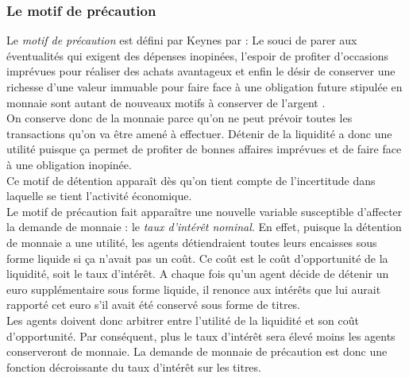 \documentclass[10pt]{book}
\begin{document}
\subsubsection{Le motif de précaution}
Le \textit{motif de précaution} est défini par Keynes par : \og Le souci de parer aux éventualités qui exigent des dépenses inopinées, l'espoir de profiter d'occasions imprévues pour réaliser des achats avantageux et enfin le désir de conserver une richesse d'une valeur immuable pour faire face à une obligation future stipulée en monnaie sont autant de nouveaux motifs à conserver de l'argent \fg .\\
On conserve donc de la monnaie parce qu'on ne peut prévoir toutes les transactions qu'on va être amené à effectuer. Détenir de la liquidité a donc une utilité puisque ça permet de profiter de bonnes affaires imprévues et de faire face à une obligation inopinée. \\
Ce motif de détention apparaît dès qu'on tient compte de l'incertitude dans laquelle se tient l'activité économique. \\
Le motif de précaution fait apparaître une nouvelle variable susceptible d'affecter la demande de monnaie : le \textit{taux d'intérêt nominal}. En effet, puisque la détention de monnaie a une utilité, les agents détiendraient toutes leurs encaisses sous forme liquide si ça n'avait pas un coût. Ce coût est le coût d'opportunité de la liquidité, soit le taux d'intérêt. A chaque fois qu'un agent décide de détenir un euro supplémentaire sous forme liquide, il renonce aux intérêts que lui aurait rapporté cet euro s'il avait été conservé sous forme de titres. \\
Les agents doivent donc arbitrer entre l'utilité de la liquidité et son coût d'opportunité. Par conséquent, plus le taux d'intérêt sera élevé moins les agents conserveront de monnaie. La demande de monnaie de précaution est donc une fonction décroissante du taux d'intérêt sur les titres. \\
\end{document}
